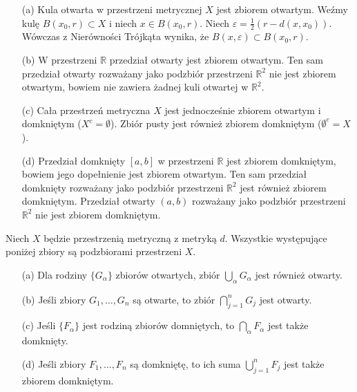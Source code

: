 \documentclass[leqno]{article}
\newcounter{thcounter}
\begin{document}
\begin{justify}
\begin{ex}
    \begin{itemize}
        \item [(a)] Kula otwarta w przestrzeni metrycznej $X$ jest zbiorem otwartym. Weźmy kulę $B(x_0, r) \subset X$ i niech $x \in B(x_0, r)$. Niech $\varepsilon = \frac{1}{2}(r - d(x, x_0))$. 
        Wówczas z Nierówności Trójkąta wynika, że $B(x, \varepsilon) \subset B(x_0, r)$.
        \item [(b)] W przestrzeni $\mathbb{R}$ przedział otwarty jest zbiorem otwartym. Ten sam przedział otwarty rozważany jako podzbiór przestrzeni $\mathbb{R}^2$ nie
        jest zbiorem otwartym, bowiem nie zawiera żadnej kuli otwartej w $\mathbb{R}^2$.
        \item [(c)] Cała przestrzeń metryczna $X$ jest jednocześnie zbiorem otwartym i domkniętym ($X^c = \emptyset$). Zbiór pusty jest również zbiorem domkniętym ($\emptyset^c = X$).
        \item [(d)] Przedział domknięty $[a,b]$ w przestrzeni $\mathbb{R}$ jest zbiorem domkniętym, bowiem jego dopełnienie jest zbiorem otwartym. Ten sam przedział
        domknięty rozważany jako podzbiór przestrzeni $\mathbb{R}^2$ jest również zbiorem domkniętym. Przedział otwarty $(a,b)$ rozważany jako podzbiór przestrzeni $\mathbb{R}^2$ nie jest zbiorem domkniętym. 
    \end{itemize}
\end{ex}

\setcounter{thcounter}{168}
\begin{theorem}
{
    Niech $X$ będzie przestrzenią metryczną z metryką $d$. Wszystkie występujące poniżej zbiory są podzbiorami przestrzeni $X$.
    \begin{itemize}
        \item [(a)] Dla rodziny $\{G_\alpha\}$ zbiorów otwartych, zbiór $\bigcup\limits_{\alpha}G_\alpha$ jest również otwarty.
        \item [(b)] Jeśli zbiory $G_1, \ldots, G_n$ są otwarte, to zbiór $\bigcap\limits_{j=1}^{n}G_j$ jest otwarty.
        \item [(c)] Jeśli $\{F_\alpha\}$ jest rodziną zbiorów domniętych, to $\bigcap\limits_\alpha F_\alpha$ jest także domknięty.
        \item [(d)] Jeśli zbiory $F_1, \ldots, F_n$ są domkniętę, to ich suma  $\bigcup\limits_{j=1}^{n}F_j$ jest także zbiorem domkniętym.
    \end{itemize}
}
\end{theorem}


\end{justify}
\end{document}
